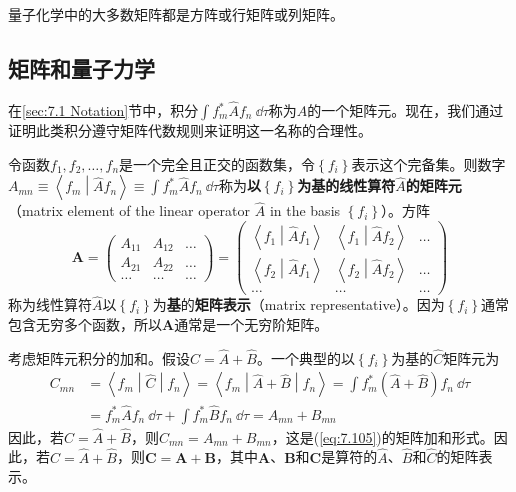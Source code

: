     量子化学中的大多数矩阵都是方阵或行矩阵或列矩阵。

\subsection*{矩阵和量子力学}

    在\ref{sec:7.1 Notation}节中，积分$\int f_m^{\ast}\hat{A}f_n \: \dd \tau$称为$\hat{A}$的一个矩阵元。现在，我们通过证明此类积分遵守矩阵代数规则来证明这一名称的合理性。

    令函数$f_1, f_2, \ldots, f_n$是一个完全且正交的函数集，令$\left\{f_i\right\}$表示这个完备集。则数字$A_{mn} \equiv \left\langle f_m \middle| \hat{A} f_n \right\rangle \equiv \int f_m^{\ast}\hat{A}f_n \: \dd \tau$称为\textbf{以$\left\{f_i\right\}$为基的线性算符$\hat{A}$的矩阵元}（matrix element of the linear operator $\hat{A}$ in the basis $\left\{f_i\right\}$）。方阵
    \begin{equation}
        \mathbf{A} = \begin{pmatrix}
            A_{11} & A_{12} & \ldots \\
            A_{21} & A_{22} & \ldots \\
            \ldots & \ldots & \ldots 
        \end{pmatrix}
        = \begin{pmatrix}
            \left\langle f_1 \middle| \hat{A} f_1 \right\rangle & \left\langle f_1 \middle| \hat{A} f_2 \right\rangle & \ldots \\
            \left\langle f_2 \middle| \hat{A} f_1 \right\rangle & \left\langle f_2 \middle| \hat{A} f_2 \right\rangle & \ldots \\
            \ldots & \ldots & \ldots
        \end{pmatrix}
        \label{eq:7.108}
    \end{equation}
    称为线性算符$\hat{A}$以$\left\{f_i\right\}$为\textbf{基}的\textbf{矩阵表示}（matrix representative）。因为$\left\{f_i\right\}$通常包含无穷多个函数，所以$\mathbf{A}$通常是一个无穷阶矩阵。

    考虑矩阵元积分的加和。假设$\hat{C} = \hat{A} + \hat{B}$。一个典型的以$\left\{f_i\right\}$为基的$\hat{C}$矩阵元为
    \begin{equation*}
        \begin{aligned}
            C_{mn} &= \left\langle f_m \middle| \hat{C} \middle| f_n \right\rangle = \left\langle f_m \middle| \hat{A} + \hat{B} \middle| f_n \right\rangle = \int f_m^{\ast}\left(\hat{A} + \hat{B}\right)f_n \: \dd \tau \\
            &= f_m^{\ast}\hat{A}f_n\:\dd \tau + \int f_m^{\ast}\hat{B}f_n \: \dd \tau = A_{mn} + B_{mn}
        \end{aligned}
    \end{equation*}
    因此，若$\hat{C} = \hat{A} + \hat{B}$，则$C_{mn} = A_{mn} + B_{mn}$，这是(\ref{eq:7.105})的矩阵加和形式。因此，若$\hat{C} = \hat{A} + \hat{B}$，则$\mathbf{C} = \mathbf{A} + \mathbf{B}$，其中$\mathbf{A}$、$\mathbf{B}$和$\mathbf{C}$是算符的$\hat{A}$、$\hat{B}$和$\hat{C}$的矩阵表示。

